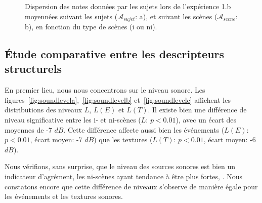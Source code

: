 \begin{figure}[t]
        \myfloatalign
       \caption{Dispersion des notes données par les sujets lors de l'expérience 1.b moyennées suivant les sujets ($\mathcal{A}_{sujet}$: a), et suivant les scènes ($\mathcal{A}_{scene}$: b), en fonction du type de scènes (i ou ni).}\label{fig:xp2_A}
\end{figure}
 
\subsection{Étude comparative entre les descripteurs structurels}

En premier lieu, nous nous concentrons sur le niveau sonore. Les figures~\ref{fig:soundlevela},~\ref{fig:soundlevelb} et~\ref{fig:soundlevelc} affichent les distributions des niveaux $L$, $L(E)$ et $L(T)$. Il existe bien une différence de niveau  significative entre les i- et ni-scènes ($L$: $p<0.01$), avec un écart des moyennes de -7 $dB$. Cette différence affecte aussi bien les événements ($L(E)$: $p<0.01$, écart moyen: -7 $dB$) que les textures ($L(T)$: $p<0.01$, écart moyen: -6 $dB$). 

Nous vérifions, sans surprise, que le niveau des sources sonores est bien un indicateur d'agrément, les ni-scènes ayant tendance à être plus fortes,  . Nous constatons encore que cette différence de niveaux s'observe de manière égale pour les événements et les textures sonores. 

